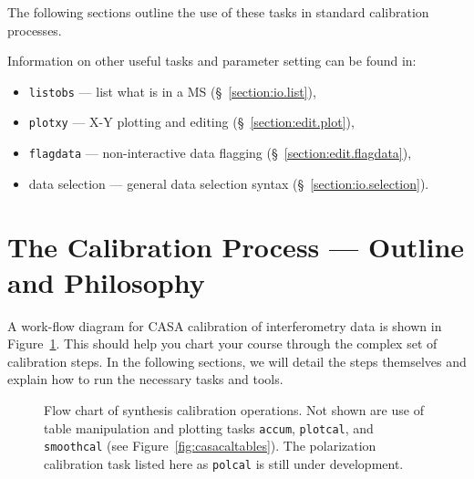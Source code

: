 The following sections outline the use of these tasks in standard calibration
processes.

Information on other useful tasks and parameter setting can be found in:
\begin{itemize}
   \item {\tt listobs} --- list what is in a MS (\S~\ref{section:io.list}),
   \item {\tt plotxy} --- X-Y plotting and editing 
      (\S~\ref{section:edit.plot}),
   \item {\tt flagdata} --- non-interactive data flagging
      (\S~\ref{section:edit.flagdata}),
   \item data selection --- general data selection syntax
      (\S~\ref{section:io.selection}).
\end{itemize}

\section{The Calibration Process --- Outline and Philosophy}
\label{section:cal.flow}

A work-flow diagram for CASA calibration of interferometry data is
shown in Figure~\ref{fig:casacalflow}.  This should help you chart
your course through the complex set of calibration steps.  In the
following sections, we will detail the steps themselves and explain
how to run the necessary tasks and tools.

\begin{figure}[h!]
\begin{center}
\caption{\label{fig:casacalflow}
Flow chart of synthesis calibration operations. Not shown are
use of table manipulation and plotting tasks {\tt accum}, 
{\tt plotcal}, and {\tt smoothcal} 
(see Figure~\ref{fig:casacaltables}).  
The polarization calibration
task listed here as {\tt polcal} is still under development.}
\hrulefill
\end{center}
\end{figure}


